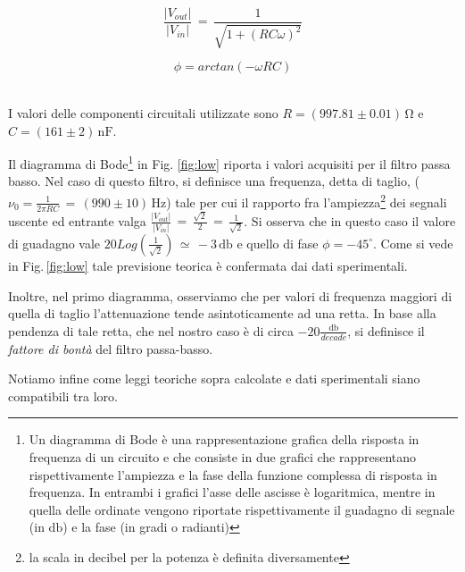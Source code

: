\noindent
\begin{minipage}{.5\linewidth}
\begin{equation}
\frac{|V_{out}|}{|V_{in}|}\,=\,\frac{1}{\sqrt{1+(RC\omega)^2}}
\label{eq:lowGain}
\end{equation}
\end{minipage}%
\begin{minipage}{.5\linewidth}
\begin{equation}
\phi=arctan(-\omega R C)
\label{eq:lowPhi}
\end{equation}
\end{minipage}\\

\noindent I valori delle componenti circuitali utilizzate sono $R=(997.81 \pm 0.01)\,\si{\ohm}$ e $C=(161 \pm 2)\,\si{\nano\farad}$.

Il diagramma di Bode\footnote{Un diagramma di Bode è una rappresentazione grafica della risposta in frequenza di un circuito e che consiste in due grafici che rappresentano rispettivamente l'ampiezza e la fase della funzione complessa di risposta in frequenza. In entrambi i grafici l'asse delle ascisse è logaritmica, mentre in quella delle ordinate vengono riportate rispettivamente il guadagno di segnale (in $\si{\decibel}$) e la fase (in gradi o radianti)} in Fig. \ref{fig:low} riporta i valori acquisiti per il filtro passa basso. Nel caso di questo filtro, si definisce una frequenza, detta di taglio, ($\nu_0=\frac{1}{2 \pi RC}\,=\,(990\pm10)\,\si{\hertz}$) tale per cui il rapporto fra l'ampiezza\footnote{la scala in decibel per la potenza è definita diversamente} dei segnali uscente ed entrante valga $\frac{|V_{out}|}{|V_{in}|}\,=\,\frac{\sqrt{2}}{2}\,=\,\frac{1}{\sqrt{2}}$. Si osserva che in questo caso il valore di guadagno vale $20Log(\frac{1}{\sqrt{2}})\,\simeq\,-3\,\si{\decibel}$ e quello di fase $\phi=-45 ^{\circ}$. Come si vede in Fig.$\,$\ref{fig:low} tale previsione teorica è confermata dai dati sperimentali.

Inoltre, nel primo diagramma, osserviamo che per valori di frequenza maggiori di quella di taglio l'attenuazione tende asintoticamente ad una retta. In base alla pendenza di tale retta, che nel nostro caso è di circa $-20\frac{\si{\decibel}}{decade}$, si definisce il \emph{fattore di bontà} del filtro passa-basso.

Notiamo infine come leggi teoriche sopra calcolate e dati sperimentali siano compatibili tra loro.
%